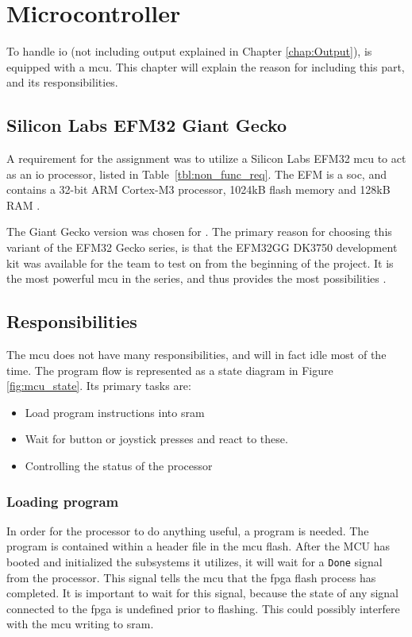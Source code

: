 \chapter{Microcontroller}
\label{ch:mcu}

To handle \gls{io} (not including output explained in Chapter \ref{chap:Output}), \vthreek is equipped with a \gls{mcu}.
This chapter will explain the reason for including this part, and its responsibilities.

\section{Silicon Labs EFM32 Giant Gecko}
A requirement for the assignment was to utilize a Silicon Labs EFM32 \gls{mcu} to act as an \gls{io} processor, listed in Table~\ref{tbl:non_func_req}.
The EFM is a \gls{soc}, and contains a 32-bit ARM Cortex-M3 processor, 1024kB flash memory and 128kB RAM \cite{efm32referencemanual}.

The Giant Gecko version was chosen for \vthreek.
The primary reason for choosing this variant of the EFM32 Gecko series, is that the EFM32GG DK3750 development kit was available for the team to test on from the beginning of the project.
It is the most powerful \gls{mcu} in the series, and thus provides the most possibilities \cite{efm32}.

\section{Responsibilities}
The \gls{mcu} does not have many responsibilities, and will in fact idle most of the time. The program flow is represented as a state diagram in Figure \ref{fig:mcu_state}.
Its primary tasks are:
\begin{itemize}
\item Load program instructions into \gls{sram}
\item Wait for button or joystick presses and react to these.
\item Controlling the status of the processor
\end{itemize}

\subsection{Loading program}
In order for the processor to do anything useful, a program is needed.
The program is contained within a header file in the \gls{mcu} flash.
After the MCU has booted and initialized the subsystems it utilizes, it will wait for a \texttt{Done} signal from the processor.
This signal tells the \gls{mcu} that the \gls{fpga} flash process has completed.
It is important to wait for this signal, because the state of any signal connected to the \gls{fpga} is undefined prior to flashing.
This could possibly interfere with the \gls{mcu} writing to \gls{sram}.

